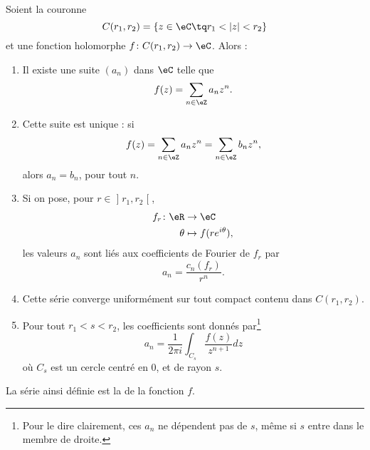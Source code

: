 \begin{theorem}       \label{THOooMKJOooVghZyG}
	Soient la couronne
	\begin{equation}
		C(r_1,r_2)=\{ z\in \eC\tq r_1<| z |<r_2 \}
	\end{equation}
	et une fonction holomorphe \( f\colon C(r_1,r_2)\to \eC\). Alors :
	\begin{enumerate}
		\item
		      Il existe une suite \( (a_n) \) dans \( \eC\) telle que
		      \begin{equation}
			      f(z)=\sum_{n\in \eZ}a_nz^n.
		      \end{equation}
		\item       \label{ITEMooUOPHooSJRGKs}
		      Cette suite est unique : si
		      \begin{equation}
			      f(z)=\sum_{n\in \eZ}a_nz^n=\sum_{n\in \eZ}b_nz^n,
		      \end{equation}
		      alors \( a_n=b_n\), pour tout \( n\).
		\item       \label{ITEMooDGGZooJkDSxC}
		      Si on pose, pour \( r\in \mathopen] r_1 , r_2 \mathclose[\),
		      \begin{equation}
			      \begin{aligned}
				      f_r\colon \eR & \to \eC                   \\
				      \theta        & \mapsto f(r e^{i\theta}),
			      \end{aligned}
		      \end{equation}
		      les valeurs \( a_n\) sont liés aux coefficients de Fourier de \( f_r\) par
		      \begin{equation}
			      a_n=\frac{ c_n(f_r) }{ r^n }.
		      \end{equation}
		\item       \label{ITEMooOYCPooZZAyKs}
		      Cette série converge uniformément sur tout compact contenu dans \( C(r_1,r_2)\).
		\item
		      Pour tout \( r_1<s<r_2\), les coefficients sont donnés par\footnote{Pour le dire clairement, ces \( a_n\) ne dépendent pas de \( s\), même si \( s\) entre dans le membre de droite.}
		      \begin{equation}
			      a_n=\frac{1}{ 2\pi i }\int_{C_s}\frac{ f(z) }{ z^{n+1} }dz
		      \end{equation}
		      où \( C_s\) est un cercle centré en \( 0\), et de rayon \( s\).
	\end{enumerate}
	La série ainsi définie est la  de la fonction \( f\).
\end{theorem}

